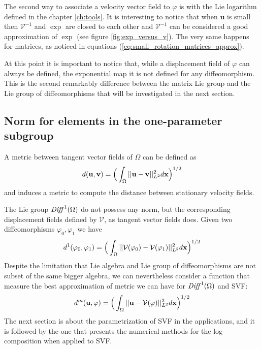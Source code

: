 The second way to associate a velocity vector field to $\varphi$ is with the Lie logarithm defined in the chapter \ref{ch:tools}. It is interesting to notice that when $\mathbf{u}$ is small then $\mathcal{V}^{-1}$ and $\exp$ are closed to each other and $\mathcal{V}^{-1}$ can be considered a good approximation of $\exp$ (see figure \ref{fig:exp_versus_v}). The very same happens for matrices, as noticed in equations (\ref{eq:small_rotation_matrices_approx}).

At this point it is important to notice that, while a displacement field of $\varphi$ can always be defined, the exponential map it is not defined for any diffeomorphism. This is the second remarkably difference between the matrix Lie group and the Lie group of diffeomorphisms that will be investigated in the next section.




\subsection{Norm for elements in the one-parameter subgroup}\label{subse:norm}
A metric between tangent vector fields of $\Omega$ can be defined as 
\begin{align}\label{def:metric_two_svf}
d(\mathbf{u}, \mathbf{v}) 
= 
\Big( \int_{\Omega} \vert\lvert \mathbf{u} - \mathbf{v} \rvert\vert_{L^2}^{2} d\mathbf{x} \Big)^{1/2}
\end{align} 
and induces a metric to compute the distance between stationary velocity fields.

The Lie group $\text{\emph{Diff}}^{1}(\Omega)$ do not possess any norm, but the corresponding displacement fields defined by $\mathcal{V}$, as tangent vector fields does. Given two diffeomorphisms $\varphi_0,\varphi_1$ we have
\begin{align}\label{def:metric_two_displacement_field}
d^{1}(\varphi_0,\varphi_1) 
= 
\Big( \int_{\Omega} \vert\lvert \mathcal{V}(\varphi_0) - \mathcal{V}(\varphi_1) \rvert\vert_{L^2}^{2} d\mathbf{x} \Big)^{1/2}
\end{align} 
Despite the limitation that Lie algebra and Lie group of diffeomorphisms are not subset of the same bigger algebra, we can nevertheless consider a function that measure the best approximation of metric we can have for $\text{\emph{Diff}}^{1}(\Omega)$ and SVF:
\begin{align}\label{def:metric_one_svf_one_displacement_field}
d^{m}(\mathbf{u},\varphi) 
= 
\Big(\int_{\Omega} \vert\lvert \mathbf{u} - \mathcal{V}(\varphi) \rvert\vert_{L^2}^{2} d\mathbf{x} \Big)^{1/2}
\end{align} 
The next section is about the parametrization of SVF in the applications, and it is followed by the one that presents the numerical methods for the log-composition when applied to SVF.

